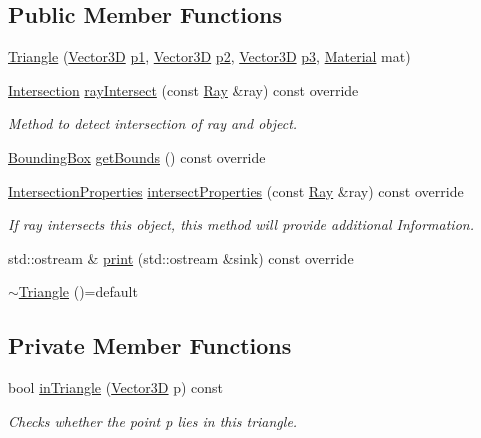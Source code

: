 \subsection*{Public Member Functions}
\begin{DoxyCompactItemize}
\item 
\hyperlink{classTriangle_a4a1cc7d9d62014eb2453d18bbd05608f}{Triangle} (\hyperlink{classVector3D}{Vector3D} \hyperlink{classTriangle_a0461ba6ca1a0e1aa84062f93eacbe8b8}{p1}, \hyperlink{classVector3D}{Vector3D} \hyperlink{classTriangle_aa15acbc4f123f3e9e75e574566c2679a}{p2}, \hyperlink{classVector3D}{Vector3D} \hyperlink{classTriangle_a600c7366c1dad8996026742eb12434c6}{p3}, \hyperlink{classMaterial}{Material} mat)
\item 
\hyperlink{classIntersection}{Intersection} \hyperlink{classTriangle_a4265ad6580a511c2beb08ab4dc752285}{ray\+Intersect} (const \hyperlink{classRay}{Ray} \&ray) const override
\begin{DoxyCompactList}\small\item\em Method to detect intersection of ray and object. \end{DoxyCompactList}\item 
\hyperlink{classBoundingBox}{Bounding\+Box} \hyperlink{classTriangle_a90617660c39cf8b56621b5964c74a555}{get\+Bounds} () const override
\item 
\hyperlink{classIntersectionProperties}{Intersection\+Properties} \hyperlink{classTriangle_a01471035c072fa83560975a29024bb30}{intersect\+Properties} (const \hyperlink{classRay}{Ray} \&ray) const override
\begin{DoxyCompactList}\small\item\em If ray intersects this object, this method will provide additional Information. \end{DoxyCompactList}\item 
std\+::ostream \& \hyperlink{classTriangle_af5089786289dbeb3a5f41affb4edb569}{print} (std\+::ostream \&sink) const override
\item 
\hyperlink{classTriangle_a2b4c058428898080754e39009819ca38}{$\sim$\+Triangle} ()=default
\end{DoxyCompactItemize}
\subsection*{Private Member Functions}
\begin{DoxyCompactItemize}
\item 
bool \hyperlink{classTriangle_a1b3d921c1ed274eb5c30504826cf75a9}{in\+Triangle} (\hyperlink{classVector3D}{Vector3D} p) const 
\begin{DoxyCompactList}\small\item\em Checks whether the point p lies in this triangle. \end{DoxyCompactList}\end{DoxyCompactItemize}
